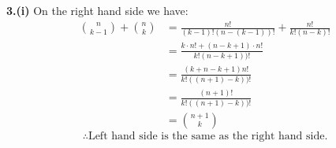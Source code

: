 \documentclass[a4paper,12pt]{report}
\begin{document}
\noindent
\textbf{3.(i)}
On the right hand side we have:
\begin{align*}
\binom n{k-1}+\binom nk
&=\frac{n!}{(k-1)!(n-(k-1))!}+\frac{n!}{k!(n-k)!}\\
&=\frac{k\cdot{n!}+(n-k+1)\cdot{n!}}{k!(n-k+1))!}\\
&=\frac{(k+n-k+1)n!}{k!((n+1)-k))!}\\
&=\frac{(n+1)!}{k!((n+1)-k))!}\\
&=\binom {n+1}{k}
\end{align*}
\[\therefore \text{Left hand side is the same as the right hand side.}\]
\end{document}
